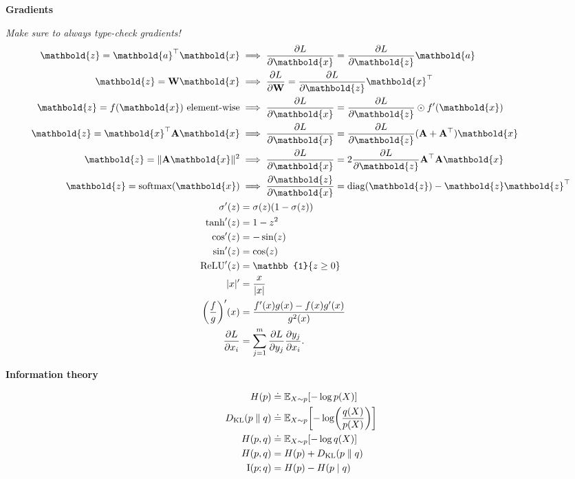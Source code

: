 \documentclass[10pt]{article}
\newenvironment{subtopic}[1]
{\vspace{0.1cm} \begin{center}\textbf{\footnotesize \sffamily #1}\end{center}}
{}
\renewcommand{\mat}[1]{\ensuremath{\mathbf{#1}}}
\renewcommand{\vec}[1]{\ensuremath{\mathbold{#1}}}
\begin{document}
\begin{multicols*}{3}
    \begin{subtopic}{Gradients}
        \textit{Make sure to always type-check gradients!}
        \begin{align*}
            \vec{z} = \transpose{\vec{a}} \vec{x} & \implies \pdv{L}{\vec{x}} = \pdv{L}{\vec{z}} \vec{a} \\
            \vec{z} = \mat{W} \vec{x} & \implies \pdv{L}{\mat{W}} = \pdv{L}{\vec{z}} \transpose{\vec{x}} \\
            \vec{z} = f(\vec{x}) \text{ element-wise} & \implies \pdv{L}{\vec{x}} = \pdv{L}{\vec{z}} \odot f'(\vec{x})   \\
            \vec{z} = \transpose{\vec{x}}\mat{A}\vec{x} & \implies \pdv{L}{\vec{x}} = \pdv{L}{\vec{z}} (\mat{A}+\transpose{\mat{A}})\vec{x} \\
            \vec{z} = \| \mat{A} \vec{x} \|^2 & \implies \pdv{L}{\vec{x}} = 2 \pdv{L}{\vec{z}} \transpose{\mat{A}} \mat{A} \vec{x} \\
            \vec{z} = \mathrm{softmax}(\vec{x}) & \implies \pdv{\vec{z}}{\vec{x}} = \mathrm{diag}(\vec{z}) - \vec{z}\transpose{\vec{z}} \\
            \sigma'(z) & = \sigma(z) (1-\sigma(z)) \\
            \tanh'(z) & = 1 - z^2 \\
            \cos'(z) & = -\sin(z) \\
            \sin'(z) & = \cos(z) \\
            \mathrm{ReLU}'(z) & = \mathbb{1}\{ z \geq 0 \} \\
            |x|' & = \frac{x}{|x|} \\
            \lft( \frac{f}{g} \rgt)'(x) & = \frac{f'(x) g(x) - f(x) g'(x)}{g^2(x)} \\
            \pdv{L}{x_i} & = \sum_{j=1}^{m} \pdv{L}{y_j} \pdv{y_j}{x_i}.
        \end{align*}
    \end{subtopic}

    \begin{subtopic}{Information theory}
        \begin{align*}
            H(p) & \doteq \E_{X \sim p}[-\log p(X)] \\
            D_{\mathrm{KL}}(p\;\|\;q) & \doteq \E_{X \sim p}\lft[ -\log \lft( \frac{q(X)}{p(X)} \rgt) \rgt] \\
            H(p, q) & \doteq \E_{X \sim p}[-\log q(X)] \\
            H(p, q) & = H(p) + D_{\mathrm{KL}}(p\;\|\;q) \\
            \mathrm{I}(p; q) & = H(p) - H(p \mid q) \\
        \end{align*}
    \end{subtopic}


\end{multicols*}
\end{document}
